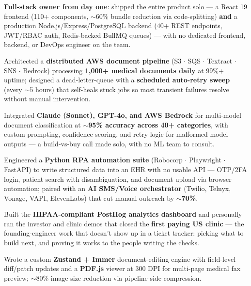 \documentclass[a4paper,10pt]{article}
\begin{document}
\vspace{2pt}
\begin{itemize}[leftmargin=0.15in, itemsep=1pt]
    \small{\item
    \textbf{Full-stack owner from day one}: shipped the entire product solo --- a React 19 frontend (110+ components, $\sim$60\% bundle reduction via code-splitting) \textbf{and} a production Node.js/Express/PostgreSQL backend (40+ REST endpoints, JWT/RBAC auth, Redis-backed BullMQ queues) --- with no dedicated frontend, backend, or DevOps engineer on the team.
    }

    \small{\item
    Architected a \textbf{distributed AWS document pipeline} (S3 $\cdot$ SQS $\cdot$ Textract $\cdot$ SNS $\cdot$ Bedrock) processing \textbf{1,000+ medical documents daily} at 99\%+ uptime; designed a dead-letter-queue with a \textbf{scheduled auto-retry sweep} (every $\sim$5 hours) that self-heals stuck jobs so most transient failures resolve without manual intervention.
    }

    \small{\item
    Integrated \textbf{Claude (Sonnet), GPT-4o, and AWS Bedrock} for multi-model document classification at \textbf{$\sim$95\% accuracy across 40+ categories}, with custom prompting, confidence scoring, and retry logic for malformed model outputs --- a build-vs-buy call made solo, with no ML team to consult.
    }

    \small{\item
    Engineered a \textbf{Python RPA automation suite} (Robocorp $\cdot$ Playwright $\cdot$ FastAPI) to write structured data into an EHR with no usable API --- OTP/2FA login, patient search with disambiguation, and document upload via browser automation; paired with an \textbf{AI SMS/Voice orchestrator} (Twilio, Telnyx, Vonage, VAPI, ElevenLabs) that cut manual outreach by $\sim$\textbf{70\%}.
    }

    \small{\item
    Built the \textbf{HIPAA-compliant PostHog analytics dashboard} and personally ran the investor and clinic demos that closed the \textbf{first paying US clinic} --- the founding-engineer work that doesn't show up in a ticket tracker: picking what to build next, and proving it works to the people writing the checks.
    }

    \small{\item
    Wrote a custom \textbf{Zustand + Immer} document-editing engine with field-level diff/patch updates and a \textbf{PDF.js} viewer at 300 DPI for multi-page medical fax preview; $\sim$80\% image-size reduction via pipeline-side compression.
    }
\end{itemize}
\end{document}
